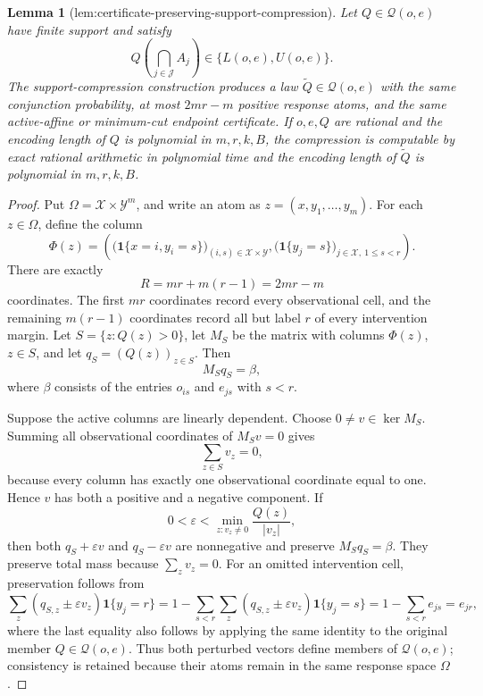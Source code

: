 \documentclass{article}
\newtheorem{lemma}{Lemma}
\begin{document}
\begin{lemma}[lem:certificate-preserving-support-compression]\label{lem:certificate-preserving-support-compression}
Let \(Q\in\mathcal Q(o,e)\) have finite support and satisfy
\[
 Q\!\left(\bigcap_{j\in\mathcal J}A_j\right)\in\{L(o,e),U(o,e)\}.
\]
The support-compression construction produces a law \(\widetilde Q\in\mathcal Q(o,e)\) with the same conjunction probability, at most \(2mr-m\) positive response atoms, and the same active-affine or minimum-cut endpoint certificate. If \(o,e,Q\) are rational and the encoding length of \(Q\) is polynomial in \(m,r,k,B\), the compression is computable by exact rational arithmetic in polynomial time and the encoding length of \(\widetilde Q\) is polynomial in \(m,r,k,B\).
\end{lemma}
\begin{proof}
Put \(\Omega=\mathcal X\times\mathcal Y^m\), and write an atom as \(z=(x,y_1,\ldots,y_m)\). For each \(z\in\Omega\), define the column
\[
 \Phi(z)=\left(
   \bigl(\mathbf 1\{x=i,y_i=s\}\bigr)_{(i,s)\in\mathcal X\times\mathcal Y},
   \bigl(\mathbf 1\{y_j=s\}\bigr)_{j\in\mathcal X,\ 1\leq s<r}
 \right).
\]
There are exactly
\[
 R=mr+m(r-1)=2mr-m
\]
coordinates. The first \(mr\) coordinates record every observational cell, and the remaining \(m(r-1)\) coordinates record all but label \(r\) of every intervention margin. Let \(S=\{z:Q(z)>0\}\), let \(M_S\) be the matrix with columns \(\Phi(z)\), \(z\in S\), and let \(q_S=(Q(z))_{z\in S}\). Then
\[
 M_Sq_S=\beta,
\]
where \(\beta\) consists of the entries \(o_{is}\) and \(e_{js}\) with \(s<r\).

Suppose the active columns are linearly dependent. Choose \(0\neq v\in\ker M_S\). Summing all observational coordinates of \(M_Sv=0\) gives
\[
 \sum_{z\in S}v_z=0,
\]
because every column has exactly one observational coordinate equal to one. Hence \(v\) has both a positive and a negative component. If
\[
 0<\varepsilon<\min_{z:v_z\neq0}\frac{Q(z)}{|v_z|},
\]
then both \(q_S+\varepsilon v\) and \(q_S-\varepsilon v\) are nonnegative and preserve \(M_Sq_S=\beta\). They preserve total mass because \(\sum_zv_z=0\). For an omitted intervention cell, preservation follows from
\[
 \sum_z(q_{S,z}\pm\varepsilon v_z)\mathbf 1\{y_j=r\}
 =1-\sum_{s<r}\sum_z(q_{S,z}\pm\varepsilon v_z)\mathbf 1\{y_j=s\}
 =1-\sum_{s<r}e_{js}=e_{jr},
\]
where the last equality also follows by applying the same identity to the original member \(Q\in\mathcal Q(o,e)\). Thus both perturbed vectors define members of \(\mathcal Q(o,e)\); consistency is retained because their atoms remain in the same response space \(\Omega\).


\end{proof}
\end{document}
